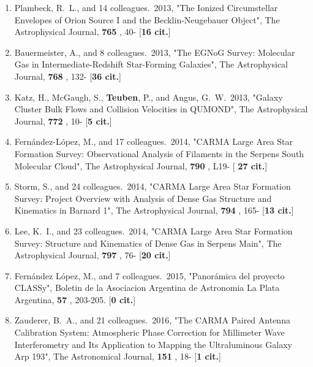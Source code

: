 \documentclass[11pt,letterpaper]{article}
\begin{document}
\begin{enumerate}[label=\textbf{\arabic*}.]
\item  
Plambeck, R.~L., and 14 colleagues.\  2013,  "The Ionized Circumstellar 
Envelopes of Orion Source I and the Becklin-Neugebauer Object", The 
Astrophysical Journal,  {\bf 765} , 40- [{\bf 16 cit.}] 

\item  
Bauermeister, A., and 8 colleagues.\  2013,  "The EGNoG Survey: Molecular 
Gas in Intermediate-Redshift Star-Forming Galaxies", The Astrophysical 
Journal,  {\bf 768} , 132- [{\bf 36 cit.}] 

\item  
Katz, H., McGaugh, S., {\bf Teuben}, P., and Angus, G.~W.\  2013,  "Galaxy 
Cluster Bulk Flows and Collision Velocities in QUMOND", The Astrophysical 
Journal,  {\bf 772} , 10- [{\bf 5 cit.}] 

\item  
Fern{\'a}ndez-L{\'o}pez, M., and 17 colleagues.\  2014,  "CARMA Large Area 
Star Formation Survey: Observational Analysis of Filaments in the Serpens 
South Molecular Cloud", The Astrophysical Journal,  {\bf 790} , L19- [{\bf 
27 cit.}] 


\item  
Storm, S., and 24 colleagues.\  2014,  "CARMA Large Area Star Formation 
Survey: Project Overview with Analysis of Dense Gas Structure and 
Kinematics in Barnard 1", The Astrophysical Journal,  {\bf 794} , 165- 
[{\bf 13 cit.}] 

\item  
Lee, K.~I., and 23 colleagues.\  2014,  "CARMA Large Area Star Formation 
Survey: Structure and Kinematics of Dense Gas in Serpens Main", The 
Astrophysical Journal,  {\bf 797} , 76- [{\bf 20 cit.}] 

\item  
Fern{\'a}ndez L{\'o}pez, M., and 7 colleagues.\  2015,  "Panor{\'a}mica del 
proyecto CLASSy", Boletin de la Asociacion Argentina de Astronomia La Plata 
Argentina,  {\bf 57} , 203-205.  [{\bf 0 cit.}] 

\item  
Zauderer, B.~A., and 21 colleagues.\  2016,  "The CARMA Paired Antenna 
Calibration System: Atmospheric Phase Correction for Millimeter Wave 
Interferometry and Its Application to Mapping the Ultraluminous Galaxy Arp 
193", The Astronomical Journal,  {\bf 151} , 18- [{\bf 1 cit.}] 


\end{enumerate}
\end{document}
